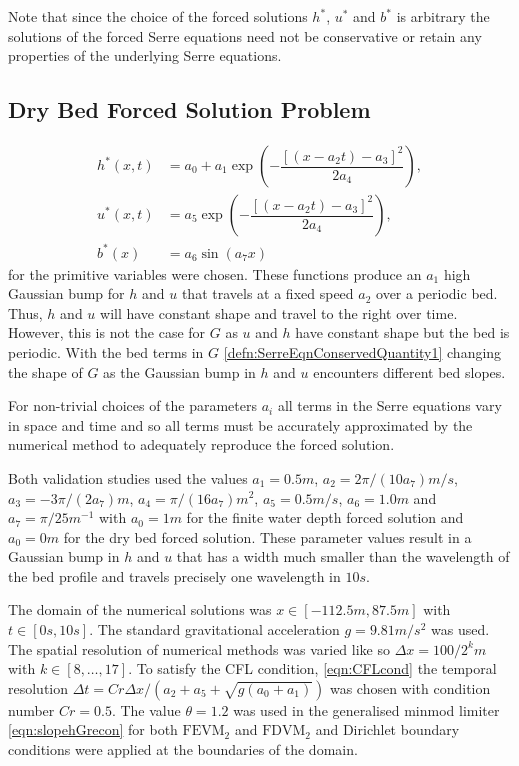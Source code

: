 \documentclass[times]{elsarticle}
\begin{document}
Note that since the choice of the forced solutions $h^*$, $u^*$ and $b^*$ is arbitrary the solutions of the forced Serre equations need not be conservative or retain any properties of the underlying Serre equations. 

\subsection{Dry Bed Forced Solution Problem}

\begin{subequations}
	\begin{align}
	\label{eqn:ForcedSolutionxt}
	h^*(x,t) &= a_0 + a_1 \exp\left(-\dfrac{\left[\left(x - a_2 t\right) - a_3\right]^2}{2 a_4}\right), \\
	u^*(x,t) &= a_5 \exp\left(-\dfrac{\left[\left(x - a_2 t\right) - a_3\right]^2}{2 a_4}\right), \\
	b^*(x) &= a_6 \sin\left(a_7 x\right)
	\end{align}
\end{subequations}
for the primitive variables were chosen. These functions produce an $a_1$ high Gaussian bump for $h$ and $u$ that travels at a fixed speed $a_2$ over a periodic bed. Thus, $h$ and $u$ will have constant shape and travel to the right over time. However, this is not the case for $G$ as $u$ and $h$ have constant shape but the bed is periodic. With the bed terms in $G$ \eqref{defn:SerreEqnConservedQuantity1} changing the shape of $G$ as the Gaussian bump in $h$ and $u$ encounters different bed slopes.

For non-trivial choices of the parameters $a_i$ all terms in the Serre equations vary in space and time and so all terms must be accurately approximated by the numerical method to adequately reproduce the forced solution. 

Both validation studies used the values $a_1 = 0.5m$, $a_2 = 2 \pi / \left(10 a_7\right) m/s$, $a_3 =- 3\pi/ \left(2 a_7\right)m$, $a_4 = \pi / (16 a_7) m^2$, $a_5 = 0.5 m/s$, $a_6 = 1.0 m$ and $a_7 = \pi / 25 m^{-1}$ with $a_0= 1m$ for the finite water depth forced solution and $a_0=0m$ for the dry bed forced solution. These parameter values result in a Gaussian bump in $h$ and $u$ that has a width much smaller than the wavelength of the bed profile and travels precisely one wavelength in $10s$.

The domain of the numerical solutions was $x \in \left[-112.5 m,87.5 m\right]$ with $t \in \left[0s,10s\right]$. The standard gravitational acceleration $g= 9.81 m/s^2$ was used. The spatial resolution of numerical methods was varied like so $\Delta x = 100 / 2^k m$ with $k \in \left[8,\dots,17\right]$. To satisfy the CFL condition, \eqref{eqn:CFLcond} the temporal resolution
$\Delta t = Cr \Delta x / \left(a_2 + a_5 + \sqrt{g\left(a_0 + a_1\right)}\right)$ was chosen with condition number $Cr = 0.5$. The value $\theta = 1.2$ was used in the generalised minmod limiter \eqref{eqn:slopehGrecon} for both $\text{FEVM}_2$ and $\text{FDVM}_2$ and Dirichlet boundary conditions were applied at the boundaries of the domain. 
\end{document}
